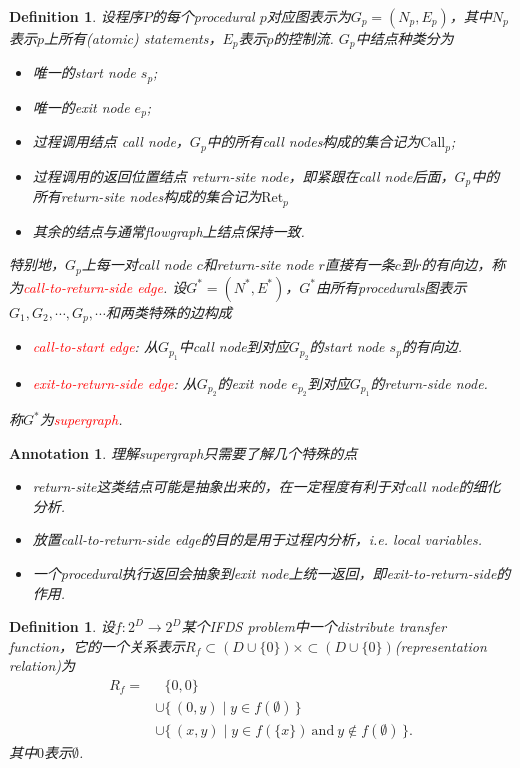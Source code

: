 \documentclass{article}
\newtheorem{definition}[theorem]{Definition}
\newtheorem{annotation}[theorem]{Annotation}
\newcommand*{\xfunc}[4]{{#2}\colon{#3}{#1}{#4}}
\newcommand*{\func}[3]{\xfunc{\to}{#1}{#2}{#3}}
\newcommand\Set[2]{\{\,#1\mid#2\,\}} %
\newcommand{\redt}[1]{\textcolor{red}{#1}}
\begin{document}
\begin{definition}
\rm 设程序$P$的每个procedural $p$对应图表示为$G_p=(N_p, E_p)$，其中$N_p$表示$p$上所有(atomic) statements，$E_p$表示$p$的控制流. $G_p$中结点种类分为
\begin{itemize}
	\item 唯一的start node $s_p$;
	\item 唯一的exit node $e_p$;
	\item 过程调用结点 call node，$G_p$中的所有call nodes构成的集合记为$\text{Call}_p$;
	\item 过程调用的返回位置结点 return-site node，即紧跟在call node后面，$G_p$中的所有return-site nodes构成的集合记为$\text{Ret}_p$
	\item 其余的结点与通常flowgraph上结点保持一致. 
\end{itemize}
特别地，$G_p$上每一对call node $c$和return-site node $r$直接有一条$c$到$r$的有向边，称为\redt{call-to-return-side edge}. 设$G^*=(N^*,E^*)$，$G^*$由所有procedurals图表示$G_1,G_2,\cdots,
G_p,\cdots$和两类特殊的边构成
\begin{itemize}
	\item \redt{call-to-start edge}: 从$G_{p_1}$中call node到对应$G_{p_2}$的start node $s_p$的有向边.
	\item \redt{exit-to-return-side edge}: 从$G_{p_2}$的exit node $e_{p_2}$到对应$G_{p_1}$的return-side node. 
\end{itemize}
称$G^*$为\redt{supergraph}.
\end{definition}


\begin{annotation}
\rm 理解supergraph只需要了解几个特殊的点
\begin{itemize}
	\item return-site这类结点可能是抽象出来的，在一定程度有利于对call node的细化分析.
	\item 放置call-to-return-side edge的目的是用于过程内分析，i.e. local variables.
	\item 一个procedural执行返回会抽象到exit node上统一返回，即exit-to-return-side的作用.
\end{itemize} 
\end{annotation}

\begin{definition}
\rm 设$\func{f}{2^D}{2^D}$某个IFDS problem中一个distribute transfer function，它的一个关系表示$R_f \subset(D \cup \{0\}) \times \subset(D \cup \{0\})$(representation relation)为
$$
\begin{aligned}
R_f = &~~~ \{0,0\} \\
&\cup \Set{(0,y)}{y \in f(\emptyset)} \\ 
&\cup  \Set{(x,y)}{y \in f(\{x\})~\text{and}~y \notin f(\emptyset)}.
\end{aligned}
$$
其中$0$表示$\emptyset$. 
\end{definition}
\end{document}
